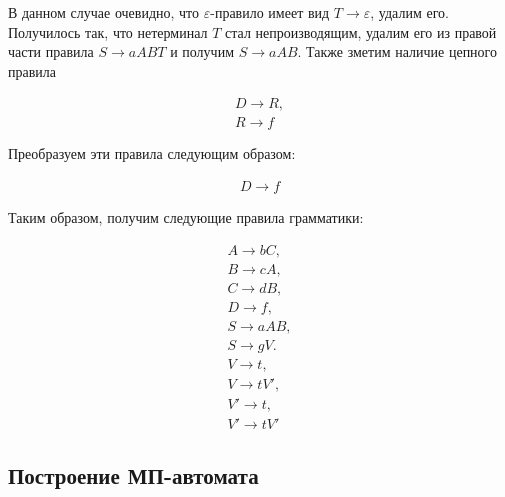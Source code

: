\documentclass[12pt]{extarticle}
\begin{document}
	В данном случае очевидно, что $\varepsilon$-правило имеет вид $T \rightarrow \varepsilon$, удалим его.
	Получилось так, что нетерминал $T$ стал непроизводящим, удалим его из правой части правила $S \rightarrow aABT$ и получим $S \rightarrow aAB$. Также зметим наличие цепного правила 
	
	\begin{gather*}
		D \rightarrow R, \\
		R \rightarrow f	
	\end{gather*}
	
	Преобразуем эти правила следующим образом:
	
	\begin{gather*}
		D \rightarrow f
	\end{gather*}
	
	Таким образом, получим следующие правила грамматики:
	
	\begin{gather*}
		A \rightarrow bC, \\
		B \rightarrow cA, \\
		C \rightarrow dB, \\
		D \rightarrow f, \\
		S \rightarrow aAB, \\  
		S \rightarrow gV. \\
		V \rightarrow t, \\ 
		V \rightarrow tV', \\
		V' \rightarrow t, \\
		V' \rightarrow tV'
	\end{gather*}
	
	\subsection{Построение МП-автомата}
	
\end{document}
